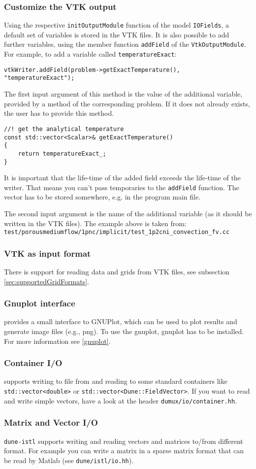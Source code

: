 \subsubsection{Customize the VTK output}
Using the respective \texttt{initOutputModule} function of the model \texttt{IOFields}, a default
set of variables is stored in the VTK files. It is also possible to add further variables,
using the member function \texttt{addField} of the \texttt{VtkOutputModule}. For example, to add a variable called \texttt{temperatureExact}:
\begin{lstlisting}[style=DumuxCode]
vtkWriter.addField(problem->getExactTemperature(), "temperatureExact");
\end{lstlisting}

The first input argument of this method is the value of the additional variable, provided by a method of the corresponding problem.
If it does not already exists, the user has to provide this method.
\begin{lstlisting}[style=DumuxCode]
//! get the analytical temperature
const std::vector<Scalar>& getExactTemperature()
{
    return temperatureExact_;
}
\end{lstlisting}
It is important that the life-time of the added field exceeds the life-time of the writer. That means you can't pass temporaries
to the \texttt{addField} function. The vector has to be stored somewhere, e.g. in the program main file.

The second input argument is the name of the additional variable (as it should be written in the VTK files).
The example above is taken from: \\ \texttt{test/porousmediumflow/1pnc/implicit/test\_1p2cni\_convection\_fv.cc}

\subsubsection{VTK as input format}
There is support for reading data and grids from VTK files, see subsection \ref{sec:supportedGridFormats}.

\subsubsection{Gnuplot interface}
\Dumux provides a small interface to GNUPlot, which can be used to plot results and generate
image files (e.g., png). To use the gnuplot, gnuplot has to be installed. For more information see \ref{gnuplot}.

\subsubsection{Container I/O}
\Dumux supports writing to file from and reading to some standard \Cplusplus containers like \texttt{std::vector<double>} or \texttt{std::vector<Dune::FieldVector>}.
If you want to read and write simple vectors, have a look at the header \texttt{dumux/io/container.hh}.

\subsubsection{Matrix and Vector I/O}
\texttt{dune-istl} supports writing and reading vectors and matrices to/from different format. For example you can write a matrix in a sparse matrix format that
can be read by Matlab (see \texttt{dune/istl/io.hh}).
